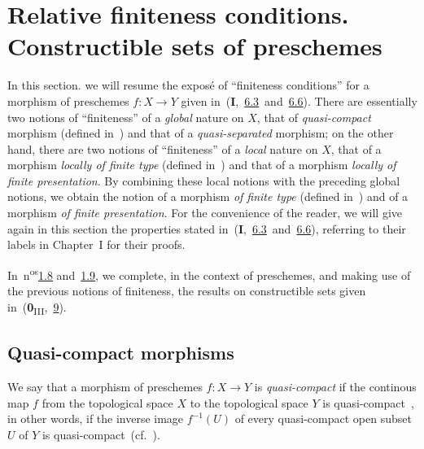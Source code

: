 \section{Relative finiteness conditions. Constructible sets of preschemes}
\label{section:relative-finiteness-conditions-constructible-sets-of-preschemes}

In this section. we will resume the expos\'e of ``finiteness conditions'' for a morphism of preschemes $f:X\to Y$ given in~(\textbf{I},~\hyperref[subsection:1.6.3]{6.3}~and~\hyperref[subsection:1.6.6]{6.6}).
There are essentially two notions of ``finiteness'' of a \emph{global} nature on $X$, that of \emph{quasi-compact} morphism (defined in~) and that of a \emph{quasi-separated} morphism; on the other hand, there are two notions of ``finiteness'' of a \emph{local} nature on $X$, that of a morphism \emph{locally of finite type} (defined in~) and that of a morphism \emph{locally of finite presentation}.
By combining these local notions with the preceding global notions, we obtain the notion of a morphism \emph{of finite type} (defined in~) and of a morphism \emph{of finite presentation}.
For the convenience of the reader, we will give again in this section the properties stated in~(\textbf{I},~\hyperref[subsection:1.6.3]{6.3}~and~\hyperref[subsection:1.6.6]{6.6}), referring to their labels in Chapter~I for their proofs.

In~n\textsuperscript{os}\hyperref[subsection:4.1.8]{1.8} and~\hyperref[subsection:4.1.9]{1.9}, we complete, in the context of preschemes, and making use of the previous notions of finiteness, the results on constructible sets given in~(\textbf{0}\textsubscript{III},~\textsection\hyperref[section:1.9]{9}).

\subsection{Quasi-compact morphisms}
\label{subsection:quasi-compact-morphisms}

\begin{defn}[1.1.1]
\label{4.1.1.1}
We say that a morphism of preschemes $f:X\to Y$ is \emph{quasi-compact} if the continous map $f$ from the topological space $X$ to the topological space $Y$ is quasi-compact~, in other words, if the inverse image $f^{-1}(U)$ of every quasi-compact open subset $U$ of $Y$ is quasi-compact~(cf.~).
\end{defn}


